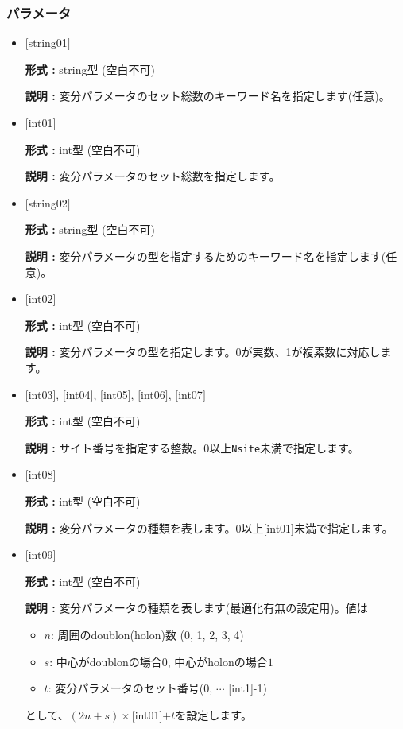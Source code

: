 \subsubsection{パラメータ}
 \begin{itemize}

   \item  $[$string01$]$
   
    {\bf 形式 :} string型 (空白不可)

   {\bf 説明 :} 変分パラメータのセット総数のキーワード名を指定します(任意)。

   \item  $[$int01$]$
   
    {\bf 形式 :} int型 (空白不可)

   {\bf 説明 :} 変分パラメータのセット総数を指定します。

   \item  $[$string02$]$
   
    {\bf 形式 :} string型 (空白不可)

   {\bf 説明 :} 変分パラメータの型を指定するためのキーワード名を指定します(任意)。

   \item  $[$int02$]$
   
    {\bf 形式 :} int型 (空白不可)

   {\bf 説明 :} 変分パラメータの型を指定します。0が実数、1が複素数に対応します。

  \item   $[$int03$]$,  $[$int04$]$, $[$int05$]$, $[$int06$]$, $[$int07$]$
   
 {\bf 形式 :} int型 (空白不可)

{\bf 説明 :} サイト番号を指定する整数。0以上\verb|Nsite|{未満}で指定します。
 
 \item  $[$int08$]$
   
   {\bf 形式 :} int型 (空白不可)

  {\bf 説明 :} 変分パラメータの種類を表します。0以上[int01]{未満}で指定します。

 \item  $[$int09$]$
   
   {\bf 形式 :} int型 (空白不可)

  {\bf 説明 :} 変分パラメータの種類を表します(最適化有無の設定用)。値は
  \begin{itemize}
  \item{$n$}: 周囲のdoublon(holon)数 (0, 1, 2, 3, 4)  \\
  \item{$s$}: 中心がdoublonの場合$0$, 中心がholonの場合$1$ \\
  \item{$t$}: 変分パラメータのセット番号(0, $\cdots$ [int1]-1)
  \end{itemize}  
  として、$(2n+s)\times$[int01]$+t$を設定します。
  

\end{itemize}
